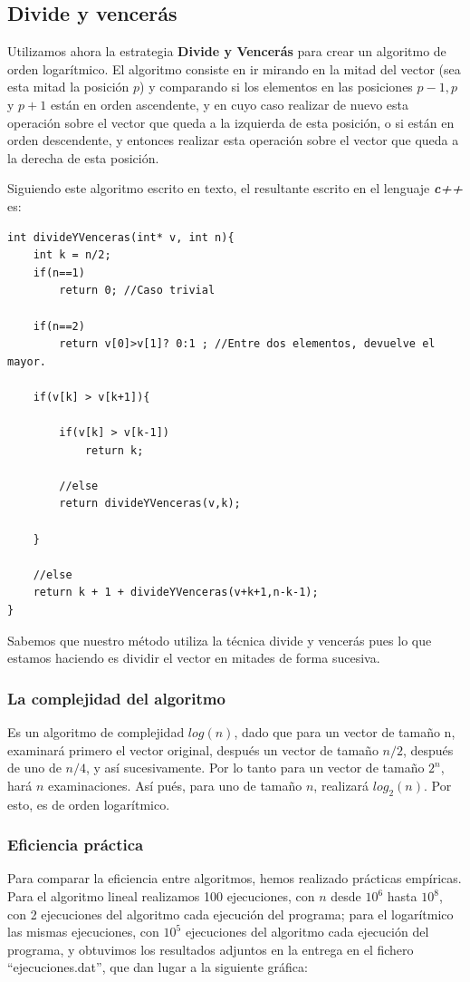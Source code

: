 \documentclass[a4paper, 11pt]{article}
\begin{document}
\subsection{Divide y vencerás}
Utilizamos ahora la estrategia \textbf{Divide y Vencerás} para crear un algoritmo de orden logarítmico. El algoritmo consiste en ir mirando en la mitad del vector (sea esta mitad la posición $p$) y comparando si los elementos en las posiciones $p-1,p$ y $p+1$ están en orden ascendente, y en cuyo caso realizar de nuevo esta operación sobre el vector que queda a la izquierda de esta posición, o si están en orden descendente, y entonces realizar esta operación sobre el vector que queda a la derecha de esta posición.

Siguiendo este algoritmo escrito en texto, el resultante escrito en el lenguaje \emph{\textbf{c++}} es:
\begin{lstlisting}
int divideYVenceras(int* v, int n){
	int k = n/2;
	if(n==1)
		return 0; //Caso trivial
	
	if(n==2)
		return v[0]>v[1]? 0:1 ; //Entre dos elementos, devuelve el mayor.

	if(v[k] > v[k+1]){

		if(v[k] > v[k-1]) 
			return k;

		//else
		return divideYVenceras(v,k);

	}

	//else
	return k + 1 + divideYVenceras(v+k+1,n-k-1);
}

\end{lstlisting}

Sabemos que nuestro método utiliza la técnica divide y vencerás pues lo que estamos haciendo es dividir el vector en mitades de forma sucesiva.

\subsubsection{La complejidad del algoritmo}
Es un algoritmo de complejidad $log(n)$, dado que para un vector de tamaño n, examinará primero el vector original, después un vector de tamaño $n/2$, después de uno de $n/4$, y así sucesivamente. Por lo tanto para un vector de tamaño $2^n$, hará $n$ examinaciones. Así pués, para uno de tamaño $n$, realizará $log_2(n)$. Por esto, es de orden logarítmico.

\subsubsection{Eficiencia práctica}
Para comparar la eficiencia entre algoritmos, hemos realizado prácticas empíricas. Para el algoritmo lineal realizamos 100 ejecuciones, con $n$ desde $10^6$ hasta $10^8$, con 2 ejecuciones del algoritmo cada ejecución del programa; para el logarítmico las mismas ejecuciones, con $10^5$ ejecuciones del algoritmo cada ejecución del programa, y obtuvimos los resultados adjuntos en la entrega en el fichero ``ejecuciones.dat'', que dan lugar a la siguiente gráfica:
\end{document}
